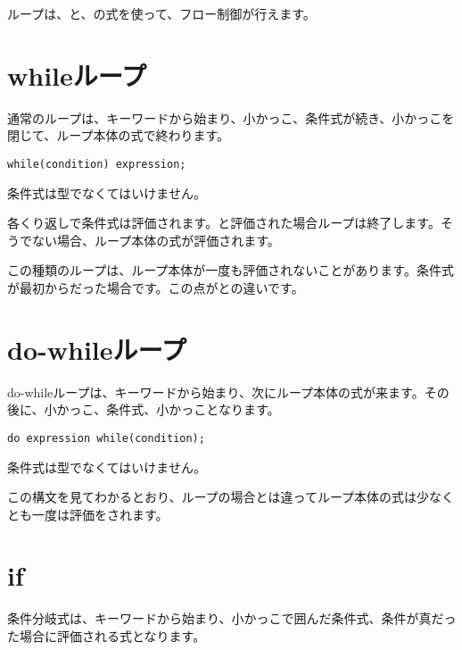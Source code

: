 ループは、と、の式を使って、フロー制御が行えます。

\section{whileループ}
\label{expression-while}

通常のループは、キーワードから始まり、小かっこ\expr{(}、条件式が続き、小かっこ\expr{)}を閉じて、ループ本体の式で終わります。

\begin{lstlisting}
while(condition) expression;
\end{lstlisting}

条件式は型でなくてはいけません。

各くり返しで条件式は評価されます。と評価された場合ループは終了します。そうでない場合、ループ本体の式が評価されます。


この種類のループは、ループ本体が一度も評価されないことがあります。条件式が最初からだった場合です。この点がとの違いです。

\section{do-whileループ}
\label{expression-do-while}

do-whileループは、キーワードから始まり、次にループ本体の式が来ます。その後に、小かっこ\expr{(}、条件式、小かっこ\expr{)}となります。

\begin{lstlisting}
do expression while(condition);
\end{lstlisting}

条件式は型でなくてはいけません。

この構文を見てわかるとおり、ループの場合とは違ってループ本体の式は少なくとも一度は評価をされます。

\section{if}
\label{expression-if}

条件分岐式は、キーワードから始まり、小かっこ\expr{()}で囲んだ条件式、条件が真だった場合に評価される式となります。

